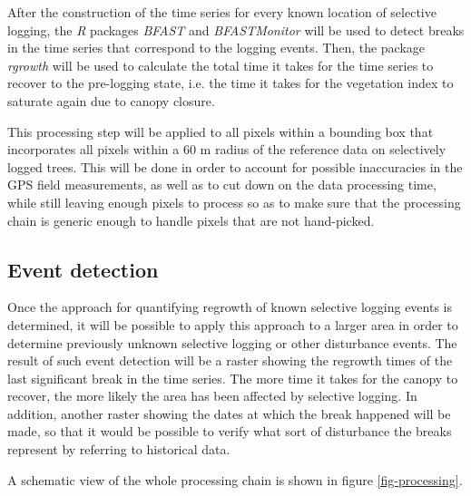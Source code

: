 \documentclass[a4paper,10pt]{article}
\begin{document}
After the construction of the time series for every known location of selective logging, the \textit{R} packages \textit{BFAST} \citep{verbesselt_detecting_2010} and \textit{BFASTMonitor} \citep{verbesselt_near_2012} will be used to detect breaks in the time series that correspond to the logging events. Then, the package \textit{rgrowth} \citep{devries_tracking_2015} will be used to calculate the total time it takes for the time series to recover to the pre-logging state, i.e. the time it takes for the vegetation index to saturate again due to canopy closure.

This processing step will be applied to all pixels within a bounding box that incorporates all pixels within a 60 m radius of the reference data on selectively logged trees. This will be done in order to account for possible inaccuracies in the GPS field measurements, as well as to cut down on the data processing time, while still leaving enough pixels to process so as to make sure that the processing chain is generic enough to handle pixels that are not hand-picked.

\subsection{Event detection}

Once the approach for quantifying regrowth of known selective logging events is determined, it will be possible to apply this approach to a larger area in order to determine previously unknown selective logging or other disturbance events. The result of such event detection will be a raster showing the regrowth times of the last significant break in the time series. The more time it takes for the canopy to recover, the more likely the area has been affected by selective logging. In addition, another raster showing the dates at which the break happened will be made, so that it would be possible to verify what sort of disturbance the breaks represent by referring to historical data.

A schematic view of the whole processing chain is shown in figure \ref{fig-processing}.

\end{document}

